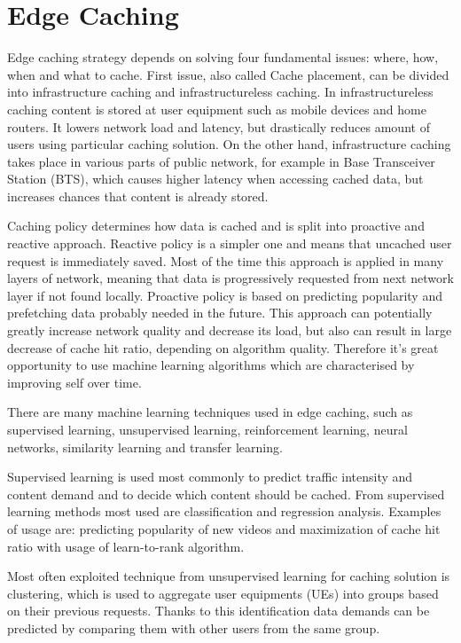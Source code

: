 \documentclass[conference]{IEEEtran}
\begin{document}
\section{Edge Caching}
Edge caching strategy depends on solving four fundamental issues: where, how, when and what to cache\cite{cache3}. First issue, also called Cache placement, can be divided into infrastructure caching and infrastructureless caching. In infrastructureless caching content is stored at user equipment such as mobile devices and home routers. It lowers network load and latency, but drastically reduces amount of users using particular caching solution. On the other hand, infrastructure caching takes place in various parts of public network, for example in Base Transceiver Station (BTS), which causes higher latency when accessing cached data, but increases chances that content is already stored\cite{cache3}.\par
Caching policy determines how data is cached and is split into proactive and reactive approach. Reactive policy is a simpler one and means that uncached user request is immediately saved. Most of the time this approach is applied in many layers of network, meaning that data is progressively requested from next network layer if not found locally. Proactive policy is based on predicting popularity and prefetching data probably needed in the future. This approach can potentially greatly increase network quality and decrease its load, but also can result in large decrease of cache hit ratio, depending on algorithm quality. Therefore it's great opportunity to use machine learning algorithms which are characterised by improving self over time\cite{cache3}.\par
There are many machine learning techniques used in edge caching, such as supervised learning, unsupervised learning, reinforcement learning, neural networks, similarity learning and transfer learning\cite{cache4}.\par
Supervised learning is used most commonly to predict traffic intensity and content demand and to decide which content should be cached. From supervised learning methods most used are classification and regression analysis\cite{cache1}. Examples of usage are: predicting popularity of new videos and maximization of cache hit ratio with usage of learn-to-rank algorithm\cite{cache3}.\par
Most often exploited technique from unsupervised learning for caching solution is clustering, which is used to aggregate user equipments (UEs) into groups based on their previous requests. Thanks to this identification data demands can be predicted by comparing them with other users from the same group\cite{cache1}.\par
\end{document}
